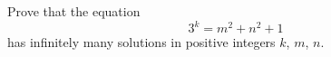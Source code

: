 Prove that the equation
\[3^k=m^2+n^2+1\]
has infinitely many solutions in positive integers $k$, $m$, $n$.
